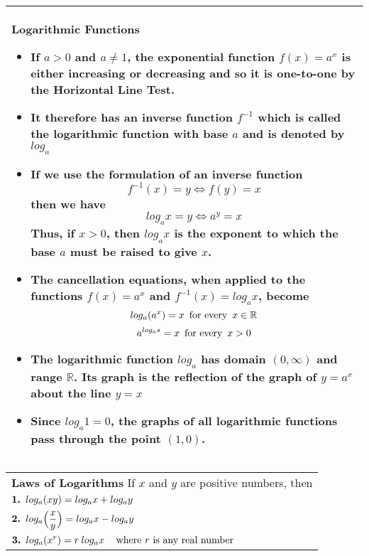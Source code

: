 \documentclass[fleqn]{article}
\begin{document}
\begin{center}
\def\arraystretch{1.3}
{\setlength{\tabcolsep}{16pt}
\begin{tabularx}{.9\textwidth}{|X|}
\hline
	\vspace{1pt}
	\textbf{Logarithmic Functions}
	\begin{itemize}
	\item If $a>0$ and $a \ne 1$, the exponential function $f(x) = a^x$ is either increasing or decreasing and so it is one-to-one by the Horizontal Line Test.  
	\item It therefore has an inverse function $f^{-1}$ which is called the \textbf{logarithmic function with base $a$} and is denoted by $log_a$
	\item If we use the formulation of an inverse function
	$$f^{-1}(x) = y \Leftrightarrow f(y) = x$$
	then we have
	$$log_ax = y \Leftrightarrow a^y = x$$
	Thus, if $x>0$, then $log_ax$ is the exponent to which the base $a$ must be raised to give $x$.
	\item The cancellation equations, when applied to the functions $f(x) = a^x$ and $f^{-1}(x) = log_ax$, become
	$$log_a(a^x) = x \text{\hspace{5pt}for every\hspace{5pt}} x \in \mathbb{R}$$
	$$a^{log_as} = x \text{\hspace{5pt}for every\hspace{5pt}} x > 0$$
	\item The logarithmic function $log_a$ has domain $(0, \infty)$ and range $\mathbb{R}$. Its graph is the reflection of the graph of $y = a^x$ about the line $y = x$
	\item Since $log_a 1 = 0$, the graphs of all logarithmic functions pass through the point $(1,0)$.
	\end{itemize}
	\\[6pt]
\hline
\end{tabularx}}
\vspace{12pt}

\def\arraystretch{1.3}
{\setlength{\tabcolsep}{16pt}
\begin{tabularx}{.9\textwidth}{|X|}
\hline
	\vspace{1pt}
	\textbf{Laws of Logarithms} \:\: If $x$ and $y$ are positive numbers, then \\[10pt]
	$\text{\textbf{1. }} log_a(xy) = log_ax + log_ay$ \\[10pt]
	$\text{\textbf{2. }} log_a \Big( \dfrac{x}{y} \Big) = log_ax - log_ay$ \\[10pt]
	$\text{\textbf{3. }} log_a(x^r) = r \: log_ax \hspace{12pt} \text{where $r$ is any real number}$
	\\[18pt]
\hline
\end{tabularx}}
\vspace{12pt}


\end{center}
\end{document}
